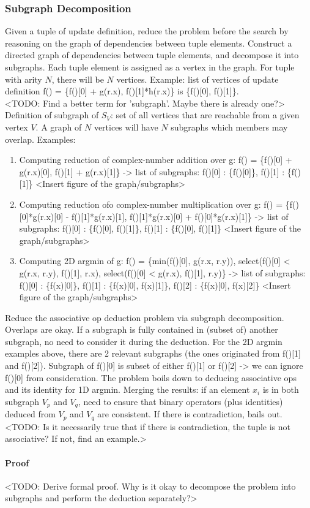 \subsubsection{Subgraph Decomposition}

Given a tuple of update definition, reduce the problem before the search by reasoning on the graph of dependencies between tuple elements. Construct a directed graph of dependencies between tuple elements, and decompose it into subgraphs. Each tuple element is assigned as a vertex in the graph. For tuple with arity $N$, there will be $N$ vertices. Example: list of vertices of update definition f() = \{f()[0] + g(r.x), f()[1]*h(r.x)\} is \{f()[0], f()[1]\}. \\

<TODO: Find a better term for 'subgraph'. Maybe there is already one?> \\

Definition of subgraph of $S_V$: set of all vertices that are reachable from a given vertex $V$. A graph of $N$ vertices will have $N$ subgraphs which members may overlap. Examples: 
\begin{enumerate}
 \item Computing reduction of complex-number addition over g: f() = \{f()[0] + g(r.x)[0], f()[1] + g(r.x)[1]\} -> list of subgraphs: f()[0] : \{f()[0]\}, f()[1] : \{f()[1]\} <Insert figure of the graph/subgraphs>
 \item Computing reduction ofo complex-number multiplication over g: f() = \{f()[0]*g(r.x)[0] - f()[1]*g(r.x)[1], f()[1]*g(r.x)[0] + f()[0]*g(r.x)[1]\} -> list of subgraphs: f()[0] : \{f()[0], f()[1]\}, f()[1] : \{f()[0], f()[1]\} <Insert figure of the graph/subgraphs>
 \item Computing 2D argmin of g: f() = \{min(f()[0], g(r.x, r.y)), select(f()[0] < g(r.x, r.y), f()[1], r.x), select(f()[0] < g(r.x), f()[1], r.y)\} -> list of subgraphs: f()[0] : \{f(x)[0]\}, f()[1] : \{f(x)[0], f(x)[1]\}, f()[2] : \{f(x)[0], f(x)[2]\} <Insert figure of the graph/subgraphs>
\end{enumerate}

Reduce the associative op deduction problem via subgraph decomposition. Overlaps are okay. If a subgraph is fully contained in (subset of) another subgraph, no need to consider it during the deduction. For the 2D argmin examples above, there are 2 relevant subgraphs (the ones originated from f()[1] and f()[2]). Subgraph of f()[0] is subset of either f()[1] or f()[2] -> we can ignore f()[0] from consideration. The problem boils down to deducing associative ops and its identity for 1D argmin. Merging the results: if an element $x_i$ is in both subgraph $V_p$ and $V_q$, need to ensure that binary operators (plus identities) deduced from $V_p$ and $V_q$ are consistent. If there is contradiction, bails out. <TODO: Is it necessarily true that if there is contradiction, the tuple is not associative? If not, find an example.> \\

\paragraph{Proof}
<TODO: Derive formal proof. Why is it okay to decompose the problem into subgraphs and perform the deduction separately?> \\


